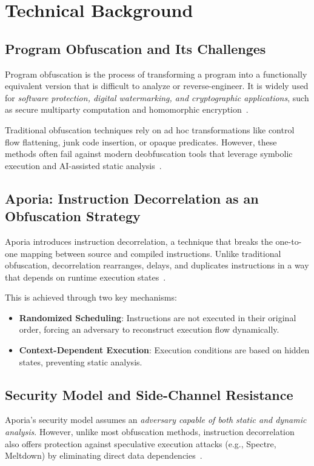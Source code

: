 \section{Technical Background}

\subsection{Program Obfuscation and Its Challenges}
Program obfuscation is the process of transforming a program into a functionally equivalent version that is difficult to analyze or reverse-engineer. It is widely used for \textit{software protection, digital watermarking, and cryptographic applications}, such as secure multiparty computation and homomorphic encryption~\cite{ajorian2024aporia}. 

Traditional obfuscation techniques rely on ad hoc transformations like control flow flattening, junk code insertion, or opaque predicates. However, these methods often fail against modern deobfuscation tools that leverage symbolic execution and AI-assisted static analysis~\cite{ajorian2024aporia}. 

\subsection{Aporia: Instruction Decorrelation as an Obfuscation Strategy}
Aporia introduces instruction decorrelation, a technique that breaks the one-to-one mapping between source and compiled instructions. Unlike traditional obfuscation, decorrelation rearranges, delays, and duplicates instructions in a way that depends on runtime execution states~\cite{ajorian2024aporia}. 

This is achieved through two key mechanisms:
\begin{itemize}
    \item \textbf{Randomized Scheduling}: Instructions are not executed in their original order, forcing an adversary to reconstruct execution flow dynamically.
    \item \textbf{Context-Dependent Execution}: Execution conditions are based on hidden states, preventing static analysis.
\end{itemize}

\subsection{Security Model and Side-Channel Resistance}
Aporia’s security model assumes an \textit{adversary capable of both static and dynamic analysis}. However, unlike most obfuscation methods, instruction decorrelation also offers protection against speculative execution attacks (e.g., Spectre, Meltdown) by eliminating direct data dependencies~\cite{ajorian2024aporia}. 

